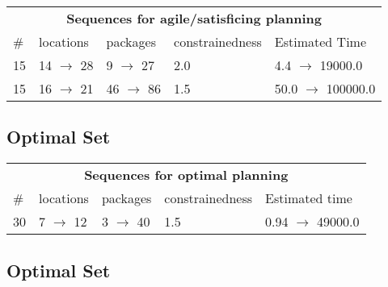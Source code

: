 \documentclass{article}
\begin{document}
                        \begin{center}
                        \begin{tabular}{@{}l|l|l|l|l@{}}
                        \multicolumn{5}{c}{\bf \large Sequences for agile/satisficing planning}\\
                        \# & locations & packages & constrainedness & Estimated Time\\\midrule
                        15&14 $\rightarrow$ 28&9 $\rightarrow$ 27&2.0&4.4 $\rightarrow$ 19000.0\\
15&16 $\rightarrow$ 21&46 $\rightarrow$ 86&1.5&50.0 $\rightarrow$ 100000.0
                        \end{tabular}
                        \end{center}
                    
                            \subsection*{Optimal Set}

                            \begin{center}
                            \begin{tabular}{@{}l|l|l|l|l@{}}
                            \multicolumn{5}{c}{\bf \large Sequences for optimal planning}\\
                            \# & locations & packages & constrainedness & Estimated time\\\midrule
                            30&7 $\rightarrow$ 12&3 $\rightarrow$ 40&1.5&0.94 $\rightarrow$ 49000.0
                            \end{tabular}
                            \end{center}
                    
                                \subsection*{Optimal Set}
                                
\end{document}
